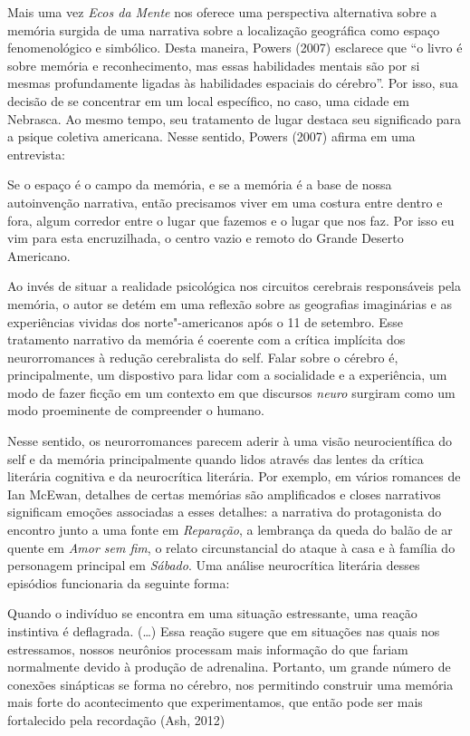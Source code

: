 Mais uma vez \emph{Ecos da Mente} nos oferece uma perspectiva
alternativa sobre a memória surgida de uma narrativa sobre a localização
geográfica como espaço fenomenológico e simbólico. Desta maneira, Powers
(2007) esclarece que ``o livro é sobre memória e reconhecimento, mas
essas habilidades mentais são por si mesmas profundamente ligadas às
habilidades espaciais do cérebro''. Por isso, sua decisão de se
concentrar em um local específico, no caso, uma cidade em Nebrasca. Ao
mesmo tempo, seu tratamento de lugar destaca seu significado para a
psique coletiva americana. Nesse sentido, Powers (2007) afirma em uma
entrevista:

Se o espaço é o campo da memória, e se a memória é a base de nossa
autoinvenção narrativa, então precisamos viver em uma costura entre
dentro e fora, algum corredor entre o lugar que fazemos e o lugar que
nos faz. Por isso eu vim para esta encruzilhada, o centro vazio e remoto
do Grande Deserto Americano.

Ao invés de situar a realidade psicológica nos circuitos cerebrais
responsáveis pela memória, o autor se detém em uma reflexão sobre as
geografias imaginárias e as experiências vividas dos norte"-americanos
após o 11 de setembro. Esse tratamento narrativo da memória é coerente
com a crítica implícita dos neurorromances à redução cerebralista do
self. Falar sobre o cérebro é, principalmente, um dispostivo para lidar
com a socialidade e a experiência, um modo de fazer ficção em um
contexto em que discursos \emph{neuro} surgiram como um modo proeminente
de compreender o humano.

Nesse sentido, os neurorromances parecem aderir à uma visão
neurocientífica do self e da memória principalmente quando lidos através
das lentes da crítica literária cognitiva e da neurocrítica literária.
Por exemplo, em vários romances de Ian McEwan, detalhes de certas
memórias são amplificados e closes narrativos significam emoções
associadas a esses detalhes: a narrativa do protagonista do encontro
junto a uma fonte em \emph{Reparação}, a lembrança da queda do balão de
ar quente em \emph{Amor sem fim}, o relato circunstancial do ataque à
casa e à família do personagem principal em \emph{Sábado}. Uma análise
neurocrítica literária desses episódios funcionaria da seguinte forma:

Quando o indivíduo se encontra em uma situação estressante, uma reação
instintiva é deflagrada. (\ldots{}) Essa reação sugere que em situações nas
quais nos estressamos, nossos neurônios processam mais informação do que
fariam normalmente devido à produção de adrenalina. Portanto, um grande
número de conexões sinápticas se forma no cérebro, nos permitindo
construir uma memória mais forte do acontecimento que experimentamos,
que então pode ser mais fortalecido pela recordação (Ash, 2012)

